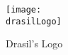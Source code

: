 \begin{figure}[H]
    \centering
    \caption{Drasil's Logo}
    \label{fig:drasilLogo}

    \texttt{[image: \\drasilLogo]}
\end{figure}
